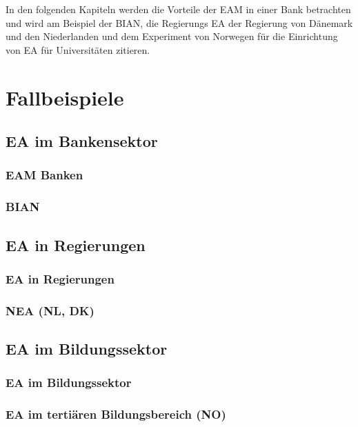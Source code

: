 \documentclass[doc]{apa6}
\begin{document}
In den folgenden Kapiteln werden die Vorteile der EAM in einer Bank betrachten und wird am Beispiel der BIAN, die Regierungs EA der Regierung von Dänemark und den Niederlanden und dem Experiment von Norwegen für die Einrichtung von EA für Universitäten zitieren.


\section{Fallbeispiele}
\subsection{EA im Bankensektor}
\subsubsection{EAM Banken}
\subsubsection{BIAN}
\subsection{EA in Regierungen}
\subsubsection{EA in Regierungen}
\subsubsection{NEA (NL, DK)}
\subsection{EA im Bildungssektor}
\subsubsection{EA im Bildungssektor}
\subsubsection{EA im tertiären Bildungsbereich (NO)}
\end{document}
